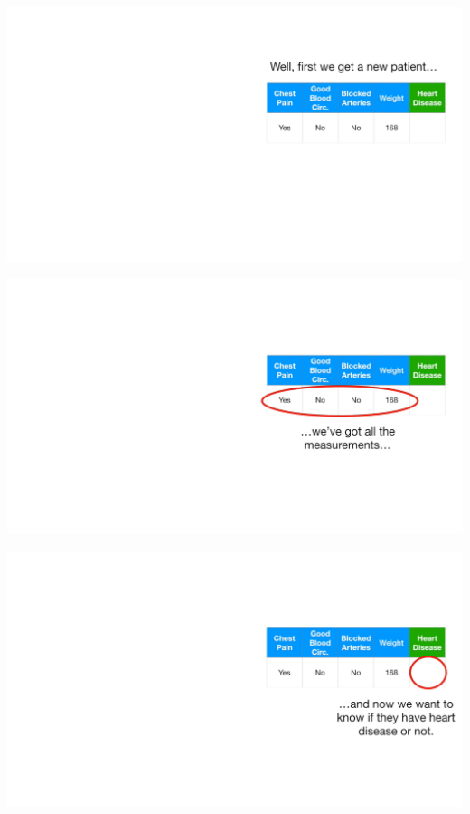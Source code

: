 \documentclass[
  ignorenonframetext,
]{beamer}
\begin{document}
\begin{frame}{}
\protect\hypertarget{section-47}{}
\includegraphics{images/r48.png}
\end{frame}

\begin{frame}{}
\protect\hypertarget{section-48}{}
\includegraphics{images/r49.png}
\end{frame}

\begin{frame}{}
\protect\hypertarget{section-49}{}
\includegraphics{images/r50.png}
\end{frame}
\end{document}
